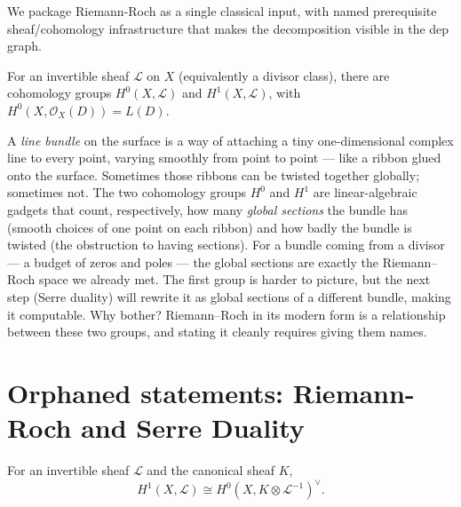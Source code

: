 We package Riemann-Roch as a single classical input, with named
prerequisite sheaf/cohomology infrastructure that makes the
decomposition visible in the dep graph.

\begin{definition}
\label{def:sheaf-cohomology-rs}
For an invertible sheaf \(\mathcal{L}\) on \(X\) (equivalently a divisor
class), there are cohomology groups \(H^{0}(X,\mathcal{L})\) and
\(H^{1}(X,\mathcal{L})\), with \(H^{0}(X,\mathcal{O}_X(D))=L(D)\).
\leanok
\end{definition}

\begin{layman}
A \emph{line bundle} on the surface is a way of attaching a tiny
one-dimensional complex line to every point, varying smoothly from point
to point --- like a ribbon glued onto the surface. Sometimes those ribbons
can be twisted together globally; sometimes not. The two cohomology
groups \(H^0\) and \(H^1\) are linear-algebraic gadgets that count,
respectively, how many \emph{global sections} the bundle has (smooth
choices of one point on each ribbon) and how badly the bundle is twisted
(the obstruction to having sections). For a bundle coming from a
divisor --- a budget of zeros and poles --- the global sections are exactly
the Riemann--Roch space we already met. The first group is harder to
picture, but the next step (Serre duality) will rewrite it as global
sections of a different bundle, making it computable. Why bother?
Riemann--Roch in its modern form is a relationship between these two
groups, and stating it cleanly requires giving them names.
\end{layman}

\section{Orphaned statements: Riemann-Roch and Serre Duality}

\begin{theorem}
\label{thm:serre-duality-rs}
For an invertible sheaf \(\mathcal{L}\) and the canonical sheaf \(K\),
\[
  H^{1}(X,\mathcal{L})\cong H^{0}(X,K\otimes\mathcal{L}^{-1})^{\vee}.
\]
\leanok
\end{theorem}

